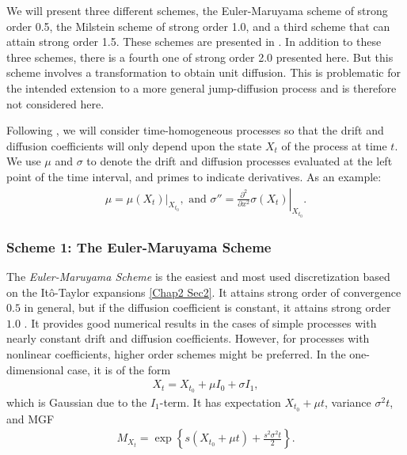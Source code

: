 We will present three different schemes, the Euler-Maruyama scheme of strong order 0.5, the Milstein scheme of strong order 1.0, and a third scheme that can attain strong order 1.5. 
These schemes are presented in \citet{preston2012approximation}. 
In addition to these three schemes, there is a fourth one of strong order 2.0 presented here.
But this scheme involves a transformation to obtain unit diffusion. 
This is problematic for the intended extension to a more general jump-diffusion process and is therefore not considered here.

Following \citet{preston2012approximation}, we will consider time-homogeneous processes so that the drift and diffusion coefficients will only depend upon the state $X_t$ of the process at time $t$. 
We use $\mu$ and $\sigma$ to denote the drift and diffusion processes evaluated at the left point of the time interval, and primes to indicate derivatives. 
As an example:
\begin{align}
\mu=\mu\left.\left(X_t\right)\right|_{X_{t_0}},
\text{ and }
\sigma''=\left.\frac{\partial^2}{\partial x^2}\sigma\left(X_t\right)\right|_{X_{t_0}}.
\end{align}

\subsubsection{Scheme 1: The Euler-Maruyama Scheme}
The \textit{Euler-Maruyama Scheme} is the easiest and most used discretization based on the Itô-Taylor expansions \eqref{Chap2 Sec2}.
It attains strong order of convergence $0.5$ in general, but if the diffusion coefficient is constant, it attains strong order $1.0$ \citep{kloeden1992numerical}.
It provides good numerical results in the cases of simple processes with nearly constant drift and diffusion coefficients.
However, for processes with nonlinear coefficients, higher order schemes might be preferred.
In the one-dimensional case, it is of the form
\begin{align}\label{Chap4 Sec1.1 euler scheme}
X_t=X_{t_0}+\mu I_0+\sigma I_1,
\end{align}
which is Gaussian due to the $I_1$-term.
It has expectation $X_{t_0}+\mu t$, variance $\sigma^2 t$, and MGF
\begin{align}
M_{X_t}=\exp\left\{ s\left(X_{t_0}+\mu t \right)+\frac{s^2\sigma^2t}{2} \right\}.
\end{align}

